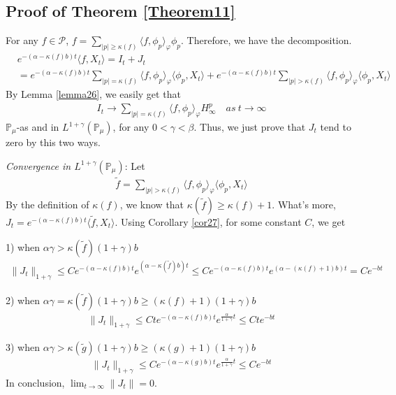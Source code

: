 \documentclass[12pt, a4paper]{amsart}
\theoremstyle{definition}
\numberwithin{equation}{section}
\begin{document}
\subsection{Proof of Theorem \ref{Theorem11}}
For any $f\in \mathcal{P}$, $f=\sum_{|p|\geq \kappa(f)}\langle f,\phi_p\rangle_\varphi \phi_p$. Therefore, we have the decomposition.
\begin{align*}
    &e^{-(\alpha-\kappa(f)b)t}\langle f,X_t\rangle=I_t+J_t\\
    &=e^{-(\alpha-\kappa(f)b)t}\sum_{|p|= \kappa(f)}\langle f,\phi_p\rangle_\varphi \langle \phi_p,X_t\rangle+e^{-(\alpha-\kappa(f)b)t}\sum_{|p|> \kappa(f)}\langle f,\phi_p\rangle_\varphi \langle \phi_p,X_t\rangle
\end{align*}
By Lemma \ref{lemma26}, we easily get that
\begin{align*}
    I_t \rightarrow \sum_{|p|=\kappa(f)}\langle f, \phi_p\rangle_{\varphi} H_{\infty}^p  \quad as~ t\rightarrow \infty
\end{align*}
$\mathbb{P}_{\mu}$-as and in $L^{1+\gamma}(\mathbb{P}_{\mu})$, for any $0< \gamma<\beta$. Thus, we just prove that $J_t$ tend to zero by this two ways.

{\em Convergence in $L^{1+\gamma}(\mathbb{P}_{\mu})$}:
Let
\begin{align*}
    \tilde{f}=\sum_{|p|> \kappa(f)}\langle f,\phi_p\rangle_\varphi \langle \phi_p,X_t\rangle
\end{align*}
By the definition of $\kappa(f)$, we know that $\kappa(\tilde{f})\geq \kappa(f)+1$. What's more, $J_t=e^{-(\alpha-\kappa(f)b)t}\langle \tilde{f},X_t\rangle$.
Using Corollary \ref{cor27}, for some constant $C$, we get

1) when $\alpha\gamma>\kappa(\tilde{f})(1+\gamma)b$
\begin{align*}
    \|J_t\|_{1+\gamma}\leq C e^{-(\alpha-\kappa(f)b)t}e^{(\alpha-\kappa(\tilde{f})b)t}\leq C  e^{-(\alpha-\kappa(f)b)t}e^{(\alpha-(\kappa(f)+1)b)t}=C e^{-bt}
\end{align*}

2) when $\alpha\gamma=\kappa(\tilde{f})(1+\gamma)b\geq (\kappa(f)+1)(1+\gamma)b$
\begin{align*}
     \|J_t\|_{1+\gamma}\leq C t e^{-(\alpha-\kappa(f)b)t}e^{\frac{\alpha}{1+\gamma}t}\leq C t e^{-bt}
\end{align*}

3) when $\alpha\gamma>\kappa(\tilde{g})(1+\gamma)b\geq (\kappa(g)+1)(1+\gamma)b$
\begin{align*}
    \|J_t\|_{1+\gamma}\leq C e^{-(\alpha-\kappa(g)b)t}e^{\frac{\alpha}{1+\gamma}t}\leq C e^{-bt}
\end{align*}
In conclusion, $\lim_{t\rightarrow \infty}\|J_t\|=0$.
\end{document}
